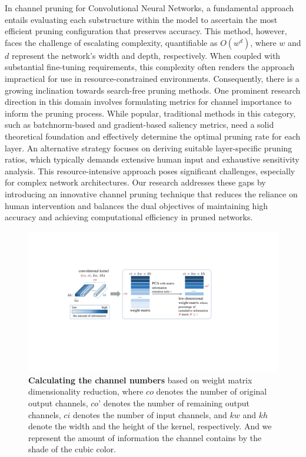 \documentclass[sigconf, 10pt]{acmart}
\begin{document}
In channel pruning for Convolutional Neural Networks, a fundamental approach entails evaluating each substructure within the model to ascertain the most efficient pruning configuration that preserves accuracy. This method, however, faces the challenge of escalating complexity, quantifiable as $O(w^d)$, where $w$ and $d$ represent the network's width and depth, respectively. When coupled with substantial fine-tuning requirements, this complexity often renders the approach impractical for use in resource-constrained environments. Consequently, there is a growing inclination towards search-free pruning methods. One prominent research direction in this domain involves formulating metrics for channel importance to inform the pruning process. While popular, traditional methods in this category, such as batchnorm-based and gradient-based saliency metrics, need a solid theoretical foundation and effectively determine the optimal pruning rate for each layer. An alternative strategy focuses on deriving suitable layer-specific pruning ratios, which typically demands extensive human input and exhaustive sensitivity analysis. This resource-intensive approach poses significant challenges, especially for complex network architectures. Our research addresses these gaps by introducing an innovative channel pruning technique that reduces the reliance on human intervention and balances the dual objectives of maintaining high accuracy and achieving computational efficiency in pruned networks.

\begin{figure}[t]
  \centering
  \includegraphics[width=\linewidth]{Fig2.pdf}
   \caption{\textbf{Calculating the channel numbers} based on weight matrix dimensionality reduction, where $co$ denotes the number of original output channels, $co’$ denotes the number of remaining output channels, $ci$ denotes the number of input channels, and $kw$ and $kh$ denote the width and the height of the kernel, respectively. And we represent the amount of information the channel contains by the shade of the cubic color.}
   \label{fig:2}
\end{figure}
\end{document}
